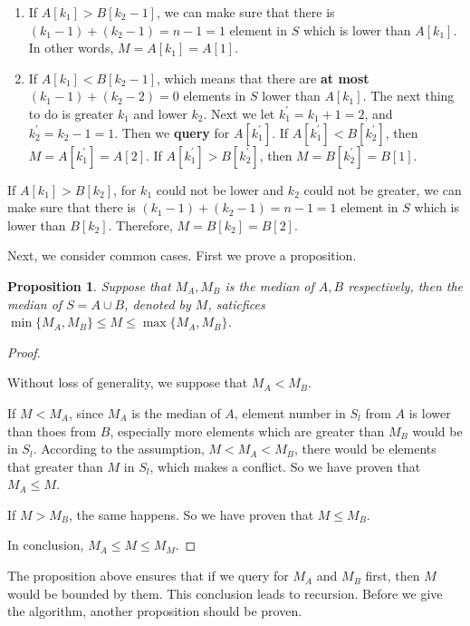 \documentclass{article}
\newtheorem{pro}{Proposition}
\begin{document}
    \begin{enumerate}
        \item If $A[k_1] > B[k_2 - 1]$, we can make sure that there is $(k_{1} - 1) + (k_{2} - 1) = n - 1 = 1$ element in $S$ which is lower than $A[k_1]$. In other words, $M = A[k_{1}] = A[1]$.
        \item If $A[k_1] < B[k_2 - 1]$, which means that there are \textbf{at most} $(k_1 - 1) + (k_2 - 2) = 0$ elements in $S$ lower than $A[k_1]$. The next thing to do is greater $k_{1}$ and lower $k_{2}$. Next we let $k^\prime_{1} = k_1 + 1 = 2$, and $k^\prime_{2} = k_2 - 1 = 1$. Then we \textbf{query} for $A[k^\prime_{1}]$. If $A[k^\prime_{1}] < B[k^\prime_{2}]$, then $M = A[k^\prime_{1}] = A[2]$. If $A[k^\prime_{1}] > B[k^\prime_{2}]$, then $M = B[k^\prime_{2}] = B[1]$.
    \end{enumerate}

    If $A[k_1] > B[k_2]$, for $k_{1}$ could not be lower and $k_{2}$ could not be greater, we can make sure that there is $(k_{1} - 1) + (k_{2} - 1) = n - 1 = 1$ element in $S$ which is lower than $B[k_2]$. Therefore, $M = B[k_{2}] = B[2]$. 

    Next, we consider common cases. First we prove a proposition.
    \begin{pro}
        Suppose that $M_{A}, M_{B}$ is the median of $A, B$ respectively, then the median of $S = A \cup B$, denoted by $M$, saticfices $\min\{M_{A}, M_{B}\} \le M \le \max\{M_{A}, M_{B}\}$.
    \end{pro}

    \begin{proof}
        \

        Without loss of generality, we suppose that $M_{A} < M_{B}$.

        If $M < M_{A}$, since $M_{A}$ is the median of $A$, element number in $S_{l}$ from $A$ is lower than thoes from $B$, especially more elements which are greater than $M_{B}$ would be in $S_{l}$. According to the assumption, $M < M_{A} < M_{B}$, there would be elements that greater than $M$ in $S_{l}$, which makes a conflict. So we have proven that $M_{A} \le M$.
        
        If $M > M_{B}$, the same happens. So we have proven that $M \le M_{B}$.

        In conclusion, $M_{A} \le M \le M_{M}$.
    \end{proof}

    The proposition above ensures that if we query for $M_{A}$ and $M_{B}$ first, then $M$ would be bounded by them. This conclusion leads to recursion. Before we give the algorithm, another proposition should be proven.
\end{document}
